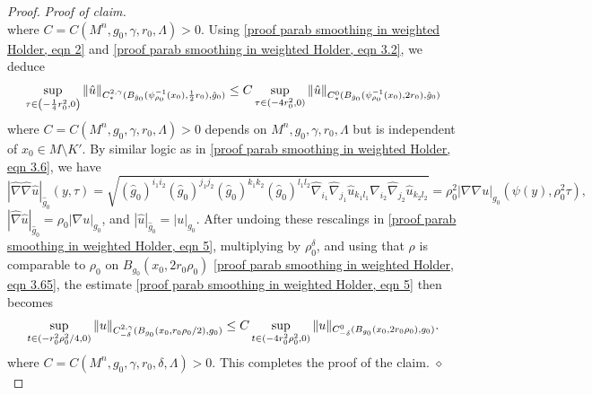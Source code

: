 \documentclass[12pt]{amsart}
\renewcommand{\1}{{\mathbf 1}}
\newenvironment{claimproof}{\par\noindent\textit{Proof of claim.}\space}{\hfill$\diamond$\medskip\par}
\theoremstyle{others}
\numberwithin{equation}{section}
\begin{document}
\begin{proof}
\begin{claimproof}
\begin{equation}
        \end{equation}
        where $C = C(M^n, g_0, \gamma, r_0, \Lambda) > 0$.
        Using \eqref{proof parab smoothing in weighted Holder, eqn 2} and \eqref{proof parab smoothing in weighted Holder, eqn 3.2}, we deduce
        \begin{equation} \label{proof parab smoothing in weighted Holder, eqn 5}
            \sup_{\tau \in \left( -\frac14 r_0^2, 0 \right) } \| \hat u \|_{C^{2, \gamma}_{ *} ( B_{\hat g_0} ( \psi_{\rho_0}^{-1}(x_0) , \frac1{ 2}r_0), \hat g_0) } \\
            \le C \sup_{\tau \in (-4r_0^2, 0)} \| \hat u \|_{C^0_{ *} (B_{\hat g_0} ( \psi_{\rho_0}^{-1}(x_0) , 2 r_0), \hat g_0)} 
        \end{equation}
        where $C = C(M^n, g_0, \gamma, r_0, \Lambda) > 0$ depends on $M^n, g_0, \gamma, r_0, \Lambda$ but is independent of $x_0 \in M \setminus K'$.
        By similar logic as in \eqref{proof parab smoothing in weighted Holder, eqn 3.6}, we have 
        \begin{equation*}
            | \hat \nabla \hat \nabla \hat u |_{\hat g_0}(y, \tau) 
            = \sqrt{ (\hat g_0)^{i_1 i_2} (\hat g_0)^{j_1 j_2} (\hat g_0)^{k_1 k_2} (\hat g_0)^{l_1 l_2}    \hat \nabla_{i_1} \hat \nabla_{j_1} \hat u_{k_1 l_1}\hat \nabla_{i_2} \hat \nabla_{j_2} \hat u_{k_2 l_2}} 
            = \rho_0^2 | \nabla \nabla u |_{g_0} ( \psi(y), \rho_0^2 \tau) ,
        \end{equation*}
        $|\hat \nabla \hat u |_{\hat g_0 } = \rho_0 |\nabla u |_{g_0}$, and $|\hat u |_{\hat g_0} = |u |_{g_0}$.
        After undoing these rescalings in \eqref{proof parab smoothing in weighted Holder, eqn 5}, multiplying by $\rho_0^\delta$, and using that $\rho$ is comparable to $\rho_0$ on $B_{g_0} ( x_0, 2 r_0 \rho_0)$ \eqref{proof parab smoothing in weighted Holder, eqn 3.65}, the estimate \eqref{proof parab smoothing in weighted Holder, eqn 5} then becomes
        \begin{equation*}
            \sup_{t \in (-r_0^2 \rho_0^2 /4, 0)} \| u \|_{C^{2, \gamma}_{-\delta}( B_{g_0}(x_0, r_0 \rho_0/2), g_0) } \\
            \le C \sup_{t \in (-4r_0^2 \rho_0^2, 0)} \| u \|_{C^0_{-\delta}( B_{g_0}(x_0, 2 r_0 \rho_0) , g_0) }  .
        \end{equation*}
        where $C = C(M^n, g_0, \gamma, r_0, \delta, \Lambda) > 0$.
        This completes the proof of the claim.
    \end{claimproof}


\end{proof}
\end{document}
